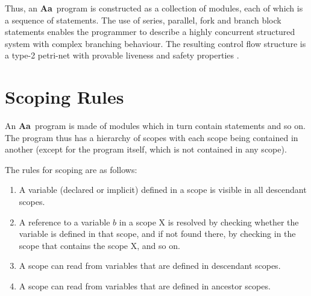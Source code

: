 \documentclass{article}
\newcommand{\Aa}{{\bf Aa}~}
\begin{document}
Thus, an \Aa program is constructed as a collection of modules,
each of which is a sequence of statements.  The use of series,
parallel, fork and branch block
statements enables the programmer to describe a highly concurrent
structured system with complex branching behaviour.  
The resulting control flow structure is a
type-2 petri-net with provable liveness and safety properties \cite{ref:SameerPhD}.

\section{Scoping Rules} \label{sec:Scopes}

An \Aa program is made of modules which in turn contain statements
and so on.  The program thus has a hierarchy of scopes with each
scope being contained in another (except for the program itself,
which is not contained in any scope).

The rules for scoping are as follows:
\begin{enumerate}
\item A variable (declared or implicit) defined in a scope is visible
in all descendant scopes.
\item A reference to a variable $b$ in a scope X is resolved by checking
whether the variable is defined in that scope, and if not found there,
by checking in the scope that contains the scope X, and so on.
\item A scope can read from variables that are defined in descendant
scopes.  
\item A scope can read from variables that are defined in ancestor scopes.
\end{enumerate}
\end{document}
